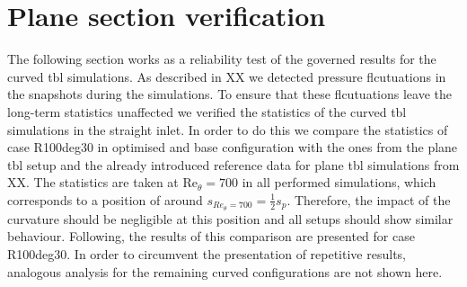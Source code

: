 \section{Plane section verification} \label{sec:planeTBLVerif}
The following section works as a reliability test of the governed results for the curved \acrshort{tbl} simulations.
As described in XX we detected pressure flcutuations in the snapshots during the simulations.
To ensure that these flcutuations leave the long-term statistics unaffected we verified the statistics of the curved \acrshort{tbl} simulations in the straight inlet.
In order to do this we compare the statistics of case R100deg30 in optimised and base configuration with the ones from the plane \acrfull{tbl} setup and the already introduced reference data for plane \acrshort{tbl} simulations from XX.
The statistics are taken at $\mathrm{Re}_{\theta} = 700$ in all performed simulations, which corresponds to a position of around $s_{Re_{\theta}= 700} = \frac{1}{2} s_p$.
Therefore, the impact of the curvature should be negligible at this position and all setups should show similar behaviour.
Following, the results of this comparison are presented for case R100deg30. 
In order to circumvent the presentation of repetitive results, analogous analysis for the remaining curved configurations are not shown here.
